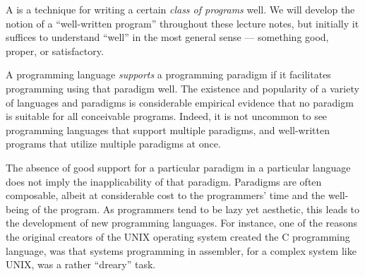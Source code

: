 A  is a technique for writing a certain \emph{class
of programs} well. We will develop the notion of a ``well-written program''
throughout these lecture notes, but initially it suffices to understand
``well'' in the most general sense --- something good, proper, or satisfactory.

A programming language \emph{supports} a programming paradigm if it facilitates
programming using that paradigm well. The existence and popularity of a variety
of languages and paradigms is considerable empirical evidence that no paradigm
is suitable for all conceivable programs. Indeed, it is not uncommon to see
programming languages that support multiple paradigms, and well-written
programs that utilize multiple paradigms at once.

The absence of good support for a particular paradigm in a particular language
does not imply the inapplicability of that paradigm.  Paradigms are often
composable, albeit at considerable cost to the programmers' time and the
well-being of the program. As programmers tend to be lazy yet aesthetic, this
leads to the development of new programming languages. For instance, one of the
reasons the original creators of the UNIX operating system created the C
programming language, was that systems programming in assembler, for a complex
system like UNIX, was a rather ``dreary'' task\cite{the-development-of-c}.







